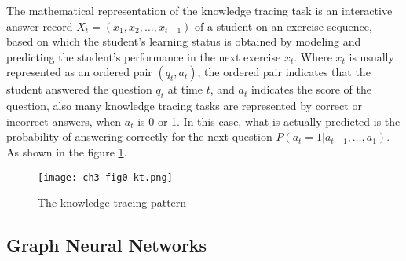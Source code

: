 The mathematical representation of the knowledge tracing task is an interactive answer record \(X_t=(x_1,x_2,\ldots,x_{t-1})\) of a student on an exercise sequence, based on which the student's learning status is obtained by modeling and predicting the student's performance in the next exercise \(x_{t}\). Where \(x_t\) is usually represented as an ordered pair \((q_t,a_t)\), the ordered pair indicates that the student answered the question \(q_t\) at time \(t\), and \(a_t\) indicates the score of the question, also many knowledge tracing tasks are represented by correct or incorrect answers, when \(a_t\) is 0 or 1. In this case, what is actually predicted is the probability of answering correctly for the next question \(P(a_{t}=1|a_{t-1},\ldots,a_1)\). As shown in the figure \figurename{\ref{fig:ch3-fig0}}.

\begin{figure}
	\texttt{[image: ch3-fig0-kt.png]}
	\caption{The knowledge tracing pattern}\label{fig:ch3-fig0}
\end{figure}

\subsection{Graph Neural Networks}

